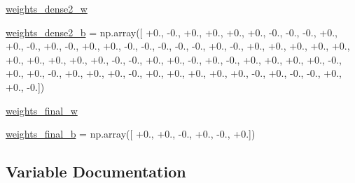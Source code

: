 \begin{DoxyCompactItemize}
\item 
\hyperlink{namespacepybullet-gym_1_1pybulletgym_1_1tests_1_1roboschool_1_1agents_1_1_half_cheetah_py_bullet_env__v0__2017may_a888d66b5e60bab6bc7e81232ff18584a}{weights\+\_\+dense2\+\_\+w}
\item 
\hyperlink{namespacepybullet-gym_1_1pybulletgym_1_1tests_1_1roboschool_1_1agents_1_1_half_cheetah_py_bullet_env__v0__2017may_ac6a34c89b59d8c4f893d8633afa30950}{weights\+\_\+dense2\+\_\+b} = np.\+array(\mbox{[} +0., -\/0., +0., +0., +0., +0., -\/0., -\/0., -\/0., +0., +0., -\/0., +0., -\/0., +0., +0., -\/0., -\/0., -\/0., -\/0., -\/0., +0., -\/0., +0., +0., +0., +0., +0., +0., +0., +0., +0., +0., -\/0., -\/0., +0., +0., -\/0., +0., -\/0., +0., +0., +0., +0., -\/0., +0., +0., -\/0., +0., +0., +0., -\/0., +0., +0., +0., +0., +0., -\/0., +0., -\/0., -\/0., +0., +0., -\/0.\mbox{]})
\item 
\hyperlink{namespacepybullet-gym_1_1pybulletgym_1_1tests_1_1roboschool_1_1agents_1_1_half_cheetah_py_bullet_env__v0__2017may_a06206f4511a76e54f393a3d1a958c34f}{weights\+\_\+final\+\_\+w}
\item 
\hyperlink{namespacepybullet-gym_1_1pybulletgym_1_1tests_1_1roboschool_1_1agents_1_1_half_cheetah_py_bullet_env__v0__2017may_a47ad6621d24de3389e36d20bb0ad5ce3}{weights\+\_\+final\+\_\+b} = np.\+array(\mbox{[} +0., +0., -\/0., +0., -\/0., +0.\mbox{]})
\end{DoxyCompactItemize}


\subsection{Variable Documentation}

